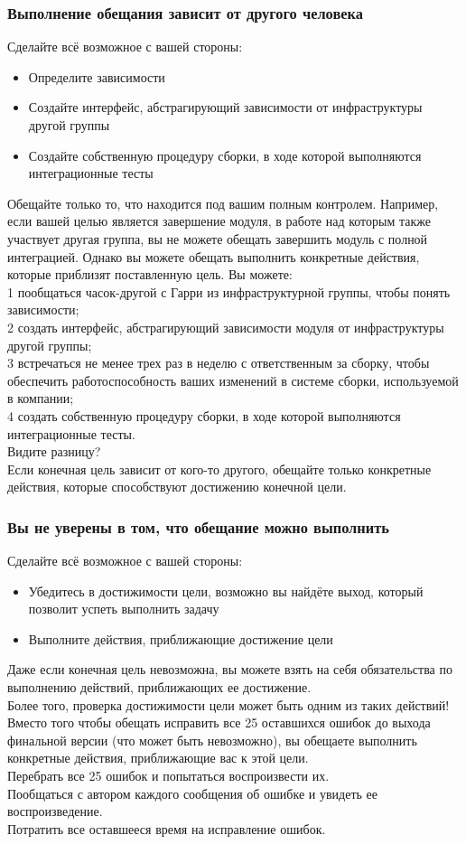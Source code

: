\documentclass{../industrial-development}
\begin{document}
\begin{frame} \frametitle{Выполнение обещания зависит от другого человека }
Сделайте всё возможное с вашей стороны:
\begin{itemize}
	\item Определите зависимости
	\item Создайте интерфейс, абстрагирующий зависимости от инфраструктуры другой группы
	\item Создайте собственную процедуру сборки, в ходе которой выполняются интеграционные тесты
\end{itemize}
\end{frame}
\lecturenotes
Обещайте только то, что находится под вашим полным контролем. Например, если вашей целью является завершение модуля, в работе
над которым также участвует другая группа, вы не можете обещать завершить модуль с полной интеграцией. Однако вы можете обещать выполнить конкретные действия, которые приблизят поставленную цель. Вы можете:\\
1 пообщаться часок-другой с Гарри из инфраструктурной группы, чтобы понять зависимости;\\
2 создать интерфейс, абстрагирующий зависимости модуля от инфраструктуры другой группы;\\
3 встречаться не менее трех раз в неделю с ответственным за сборку, чтобы обеспечить работоспособность ваших изменений в системе сборки, используемой в компании;\\
4 создать собственную процедуру сборки, в ходе которой выполняются интеграционные тесты.\\
Видите разницу?\\
Если конечная цель зависит от кого-то другого, обещайте только конкретные действия, которые способствуют достижению конечной цели.

\begin{frame} \frametitle{Вы не уверены в том, что обещание можно выполнить}
Сделайте всё возможное с вашей стороны:
\begin{itemize}
	\item Убедитесь в достижимости цели, возможно вы найдёте выход, который позволит успеть выполнить задачу
	\item Выполните действия, приближающие достижение цели
\end{itemize}
\end{frame}
\lecturenotes
Даже если конечная цель невозможна, вы можете взять на себя обязательства по выполнению действий, приближающих ее достижение.\\
Более того, проверка достижимости цели может быть одним из таких действий!\\
Вместо того чтобы обещать исправить все 25 оставшихся ошибок до выхода финальной версии (что может быть невозможно), вы обещаете выполнить конкретные действия, приближающие вас к этой цели.\\
Перебрать все 25 ошибок и попытаться воспроизвести их.\\
Пообщаться с автором каждого сообщения об ошибке и увидеть ее воспроизведение.\\
Потратить все оставшееся время на исправление ошибок.
\end{document}

